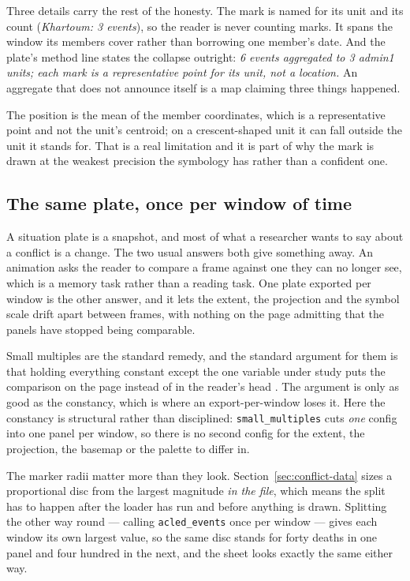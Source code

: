 \documentclass[11pt]{article}
\begin{document}
Three details carry the rest of the honesty. The mark is named for its unit
and its count (\emph{Khartoum: 3 events}), so the reader is never counting
marks. It spans the window its members cover rather than borrowing one
member's date. And the plate's method line states the collapse outright:
\emph{6 events aggregated to 3 admin1 units; each mark is a representative
point for its unit, not a location.} An aggregate that does not announce
itself is a map claiming three things happened.

The position is the mean of the member coordinates, which is a representative
point and not the unit's centroid; on a crescent-shaped unit it can fall
outside the unit it stands for. That is a real limitation and it is part of
why the mark is drawn at the weakest precision the symbology has rather than a
confident one.

\subsection{The same plate, once per window of time}
\label{sec:small-multiples}

A situation plate is a snapshot, and most of what a researcher wants to say
about a conflict is a change. The two usual answers both give something away.
An animation asks the reader to compare a frame against one they can no longer
see, which is a memory task rather than a reading task. One plate exported per
window is the other answer, and it lets the extent, the projection and the
symbol scale drift apart between frames, with nothing on the page admitting
that the panels have stopped being comparable.

Small multiples are the standard remedy, and the standard argument for them is
that holding everything constant except the one variable under study puts the
comparison on the page instead of in the reader's head
\parencite{tufte-envisioning}. The argument is only as good as the constancy,
which is where an export-per-window loses it. Here the constancy is structural
rather than disciplined: \texttt{small\_multiples} cuts \emph{one} config into
one panel per window, so there is no second config for the extent, the
projection, the basemap or the palette to differ in.

The marker radii matter more than they look. Section~\ref{sec:conflict-data}
sizes a proportional disc from the largest magnitude \emph{in the file}, which
means the split has to happen after the loader has run and before anything is
drawn. Splitting the other way round --- calling \texttt{acled\_events} once
per window --- gives each window its own largest value, so the same disc stands
for forty deaths in one panel and four hundred in the next, and the sheet looks
exactly the same either way.
\end{document}
